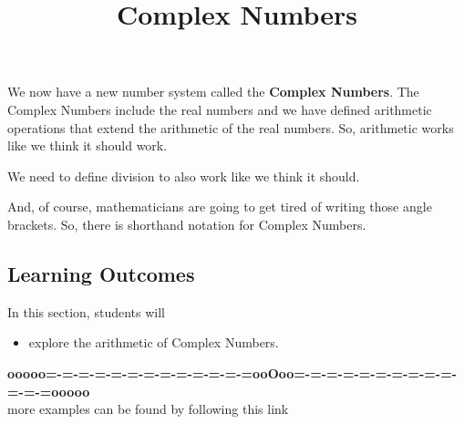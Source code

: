 \documentclass{ximera}
\title{Complex Numbers}
\begin{document}
\begin{abstract}
\end{abstract}
\maketitle







We now have a new number system called the \textbf{Complex Numbers}.  The Complex Numbers include the real numbers and we have defined arithmetic operations that extend the arithmetic of the real numbers.  So, arithmetic works like we think it should work.

We need to define division to also work like we think it should.  


And, of course, mathematicians are going to get tired of writing those angle brackets.  So, there is shorthand notation for Complex Numbers.





\subsection{Learning Outcomes}

\begin{sectionOutcomes}
In this section, students will 

\begin{itemize}
\item explore the arithmetic of Complex Numbers.
\end{itemize}
\end{sectionOutcomes}










\begin{center}
\textbf{\textcolor{green!50!black}{ooooo=-=-=-=-=-=-=-=-=-=-=-=-=ooOoo=-=-=-=-=-=-=-=-=-=-=-=-=ooooo}} \\

more examples can be found by following this link\\ 

\end{center}
\end{document}
